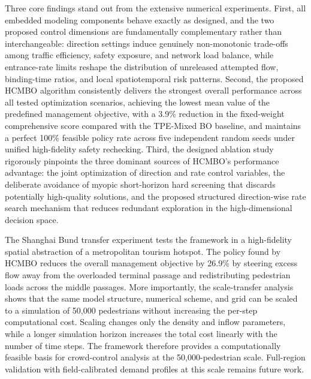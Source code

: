 \documentclass[lettersize,journal]{IEEEtran}
\begin{document}
Three core findings stand out from the extensive numerical experiments. First, all embedded modeling components behave exactly as designed, and the two proposed control dimensions are fundamentally complementary rather than interchangeable: direction settings induce genuinely non-monotonic trade-offs among traffic efficiency, safety exposure, and network load balance, while entrance-rate limits reshape the distribution of unreleased attempted flow, binding-time ratios, and local spatiotemporal risk patterns. Second, the proposed HCMBO algorithm consistently delivers the strongest overall performance across all tested optimization scenarios, achieving the lowest mean value of the predefined management objective, with a 3.9\% reduction in the fixed-weight comprehensive score compared with the TPE-Mixed BO baseline, and maintains a perfect 100\% feasible policy rate across five independent random seeds under unified high-fidelity safety rechecking. Third, the designed ablation study rigorously pinpoints the three dominant sources of HCMBO’s performance advantage: the joint optimization of direction and rate control variables, the deliberate avoidance of myopic short-horizon hard screening that discards potentially high-quality solutions, and the proposed structured direction-wise rate search mechanism that reduces redundant exploration in the high-dimensional decision space.

The Shanghai Bund transfer experiment tests the framework in a high-fidelity spatial abstraction of a metropolitan tourism hotspot. The policy found by HCMBO reduces the overall management objective by 26.9\% by steering excess flow away from the overloaded terminal passage and redistributing pedestrian loads across the middle passages. More importantly, the scale-transfer analysis shows that the same model structure, numerical scheme, and grid can be scaled to a simulation of 50,000 pedestrians without increasing the per-step computational cost. Scaling changes only the density and inflow parameters, while a longer simulation horizon increases the total cost linearly with the number of time steps. The framework therefore provides a computationally feasible basis for crowd-control analysis at the 50,000-pedestrian scale. Full-region validation with field-calibrated demand profiles at this scale remains future work.
\end{document}
